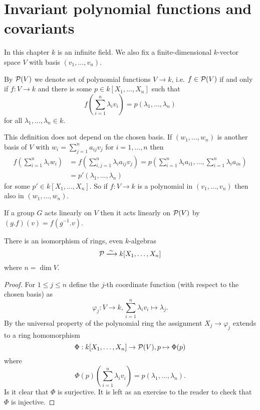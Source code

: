 \chapter{Invariant polynomial functions and covariants}


In this chapter $k$ is an infinite field. We also fix a finite-dimensional $k$-vector space $V$ with basis $(v_1, \ldots, v_n)$.


\begin{defi}
 By $\mathcal{P}(V)$ we denote set of polynomial functions $V \to k$, i.e. $f \in \mathcal{P}(V)$ if and only if $f : V \to k$ and there is some $p \in k[X_1, \ldots, X_n]$ such that
 \[
  f\left( \sum_{i=1}^n \lambda_i v_i \right) = p(\lambda_1, \ldots, \lambda_n)
 \]
 for all $\lambda_1, \ldots, \lambda_n \in k$.
\end{defi}


This definition does not depend on the chosen basis. If $(w_1, \ldots, w_n)$ is another basis of $V$ with $w_i = \sum_{j=1}^n a_{ij} v_j$ for $i=1,\ldots,n$ then
\begin{align*}
 f\left( \sum_{i=1}^n \lambda_i w_i \right)
 &= f\left( \sum_{i,j=1}^n \lambda_i a_{ij} v_j \right)
 = p\left( \sum_{i=1}^n \lambda_i a_{i1}, \ldots, \sum_{i=1}^n \lambda_{i} a_{in} \right)\\
 &= p'(\lambda_1, \ldots, \lambda_n)
\end{align*}
for some $p' \in k[X_1, \ldots, X_n]$. So if $f : V \to k$ is a polynomial in $(v_1, \ldots, v_n)$ then also in $(w_1, \ldots, w_n)$.


\begin{rem}
 If a group $G$ acts linearly on $V$ then it acts linearly on $\mathcal{P}(V)$ by $(g.f)(v) = f\left(g^{-1}.v\right)$.
\end{rem}


\begin{lem}
 There is an isomorphism of rings, even $k$-algebras
 \[
  \mc{P} \xlongrightarrow{\sim} k[X_1, \ldots, X_n]
 \]
 where $n = \dim V$.
\end{lem}
\begin{proof}
 For $1 \leq j \leq n$ define the $j$-th coordinate function (with respect to the chosen basis) as
 \[
  \varphi_j : V \to k, \sum_{i=1}^n \lambda_i v_i \mapsto \lambda_j.
 \]
 By the universal property of the polynomial ring the assignment $X_j \to \varphi_j$ extends to a ring homomorphism
 \[
  \Phi: k[X_1, \ldots, X_n] \to \mathcal{P}(V), p \mapsto \Phi(p)
 \]
 where
 \[
  \Phi(p)\left(\sum_{i=1}^n \lambda_i v_i\right) = p(\lambda_1, \ldots, \lambda_n).
 \]
 Is it clear that $\Phi$ is surjective. It is left as an exercise to the reader to check that $\Phi$ is injective.
\end{proof}



